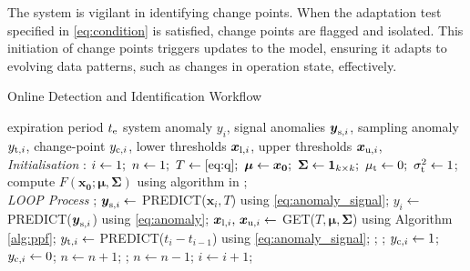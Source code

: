 The system is vigilant in identifying change points. When the adaptation test specified in \eqref{eq:condition} is satisfied, change points are flagged and isolated. This initiation of change points triggers updates to the model, ensuring it adapts to evolving data patterns, such as changes in operation state, effectively.

\begin{algorithm}[H]
  \caption{{Online Detection and Identification Workflow}} \label{alg:detector}
  \begin{algorithmic}[1]
    \renewcommand{\algorithmicrequire}{\textbf{Input:}}
    \renewcommand{\algorithmicensure}{\textbf{Output:}}
    \REQUIRE expiration period $t _{\text{e}}$
    \ENSURE system anomaly $y_i$, signal anomalies $\boldsymbol{y} _{\text{s}, i}$, sampling anomaly $y _{\text{t}, i}$, change-point $y _{\text{c}, i}$, lower thresholds $\boldsymbol{x} _{\text{l}, i}$, upper thresholds $\boldsymbol{x} _{\text{u}, i}$,
    \\ \textit{Initialisation} :
    \STATE $i \leftarrow 1;~ n \leftarrow 1;~ T \leftarrow \eqref{eq:q};~ \boldsymbol{\mu} \leftarrow \boldsymbol{x_0};~ \boldsymbol{\Sigma} \leftarrow \mathbf{1}_{k \times k};~ \mu _{\text{t}} \leftarrow 0;~ \sigma _{\text{t}}^2 \leftarrow 1$;
    \STATE compute $F(\boldsymbol{x_0}; \boldsymbol{\mu}, \boldsymbol{\Sigma})$ using algorithm in \cite{Genz2000};
    \\ \textit{LOOP Process}
    \LOOP
    ;
    \STATE $\boldsymbol{y} _{\text{s}, i} \leftarrow$ PREDICT($\boldsymbol{x}_i, T$) using \eqref{eq:anomaly_signal};
    \STATE $y_i \leftarrow$ PREDICT($\boldsymbol{y} _{\text{s}, i}$) using \eqref{eq:anomaly};
    \STATE $\boldsymbol{x} _{\text{l}, i}\text{, }\boldsymbol{x} _{\text{u}, i} \leftarrow$ GET($T, \boldsymbol{\mu}, \boldsymbol{\Sigma}$) using Algorithm \ref{alg:ppf};
    \STATE $y _{\text{t}, i} \leftarrow$ PREDICT($t_i - t_{i-1}$) using \eqref{eq:anomaly_signal};
    ;
    \IF {\eqref{eq:anomaly} = 0 \OR \eqref{eq:condition}}
    ;
    \IF {\eqref{eq:condition}}
    \STATE $y _{\text{c}, i} \leftarrow 1$;
    \ELSE
    \STATE $y _{\text{c}, i} \leftarrow 0$;
    \ENDIF
    \STATE $n \leftarrow n + 1$;
    ;
    \STATE $n \leftarrow n - 1$;
    \ENDFOR
    \ENDIF
    \STATE $i \leftarrow i + 1$;
    \ENDLOOP
  \end{algorithmic}
\end{algorithm}
